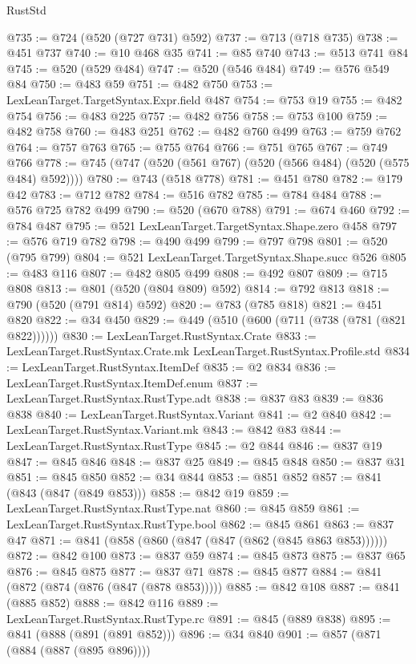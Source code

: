 \begin{lexlean}{RustStd}
\begin{coremodule}
@735 := @724 (@520 (@727 @731) @592)
@737 := @713 (@718 @735)
@738 := @451 @737
@740 := @10 @468 @35
@741 := @85 @740
@743 := @513 @741 @84
@745 := @520 (@529 @484)
@747 := @520 (@546 @484)
@749 := @576 @549 @84
@750 := @483 @59
@751 := @482 @750
@753 := LexLeanTarget.TargetSyntax.Expr.field @487
@754 := @753 @19
@755 := @482 @754
@756 := @483 @225
@757 := @482 @756
@758 := @753 @100
@759 := @482 @758
@760 := @483 @251
@762 := @482 @760 @499
@763 := @759 @762
@764 := @757 @763
@765 := @755 @764
@766 := @751 @765
@767 := @749 @766
@778 := @745 (@747 (@520 (@561 @767) (@520 (@566 @484) (@520 (@575 @484) @592))))
@780 := @743 (@518 @778)
@781 := @451 @780
@782 := @179 @42
@783 := @712 @782
@784 := @516 @782
@785 := @784 @484
@788 := @576 @725 @782 @499
@790 := @520 (@670 @788)
@791 := @674 @460
@792 := @784 @487
@795 := @521 LexLeanTarget.TargetSyntax.Shape.zero @458
@797 := @576 @719 @782
@798 := @490 @499
@799 := @797 @798
@801 := @520 (@795 @799)
@804 := @521 LexLeanTarget.TargetSyntax.Shape.succ @526
@805 := @483 @116
@807 := @482 @805 @499
@808 := @492 @807
@809 := @715 @808
@813 := @801 (@520 (@804 @809) @592)
@814 := @792 @813
@818 := @790 (@520 (@791 @814) @592)
@820 := @783 (@785 @818)
@821 := @451 @820
@822 := @34 @450
@829 := @449 (@510 (@600 (@711 (@738 (@781 (@821 @822))))))
@830 := LexLeanTarget.RustSyntax.Crate
@833 := LexLeanTarget.RustSyntax.Crate.mk LexLeanTarget.RustSyntax.Profile.std
@834 := LexLeanTarget.RustSyntax.ItemDef
@835 := @2 @834
@836 := LexLeanTarget.RustSyntax.ItemDef.enum
@837 := LexLeanTarget.RustSyntax.RustType.adt
@838 := @837 @83
@839 := @836 @838
@840 := LexLeanTarget.RustSyntax.Variant
@841 := @2 @840
@842 := LexLeanTarget.RustSyntax.Variant.mk
@843 := @842 @83
@844 := LexLeanTarget.RustSyntax.RustType
@845 := @2 @844
@846 := @837 @19
@847 := @845 @846
@848 := @837 @25
@849 := @845 @848
@850 := @837 @31
@851 := @845 @850
@852 := @34 @844
@853 := @851 @852
@857 := @841 (@843 (@847 (@849 @853)))
@858 := @842 @19
@859 := LexLeanTarget.RustSyntax.RustType.nat
@860 := @845 @859
@861 := LexLeanTarget.RustSyntax.RustType.bool
@862 := @845 @861
@863 := @837 @47
@871 := @841 (@858 (@860 (@847 (@847 (@862 (@845 @863 @853))))))
@872 := @842 @100
@873 := @837 @59
@874 := @845 @873
@875 := @837 @65
@876 := @845 @875
@877 := @837 @71
@878 := @845 @877
@884 := @841 (@872 (@874 (@876 (@847 (@878 @853)))))
@885 := @842 @108
@887 := @841 (@885 @852)
@888 := @842 @116
@889 := LexLeanTarget.RustSyntax.RustType.rc
@891 := @845 (@889 @838)
@895 := @841 (@888 (@891 (@891 @852)))
@896 := @34 @840
@901 := @857 (@871 (@884 (@887 (@895 @896))))

\end{coremodule}
\end{lexlean}
